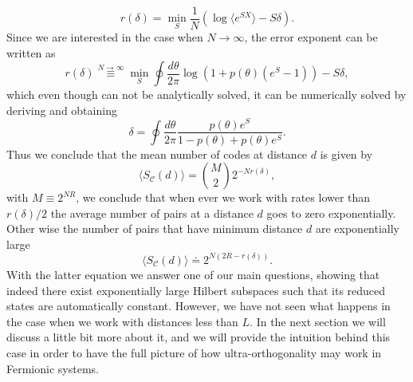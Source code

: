 \begin{equation}
r(\delta) = \min_{S} \frac{1}{N} \left(\log\langle e^{SX}\rangle - S\delta\right).
\end{equation}
\indent Since we are interested in the case when $N\to \infty$, the error exponent can be written as
\begin{equation}
r(\delta)\stackrel{N\to \infty}{\equiv}\min_{S}\oint \frac{d\theta}{2\pi}\log\left(1+p(\theta)(e^S -1)\right) -S\delta,
\label{CH2:Error_exponent}
\end{equation}
which even though can not be analytically solved, it can be numerically solved by deriving and obtaining
\begin{equation}
\delta = \oint \frac{d\theta}{2\pi} \frac{p(\theta)e^{S}}{1-p(\theta) + p(\theta)e^S}.
\end{equation}
\indent Thus we conclude that the mean number of codes at distance $d$ is given by
\begin{equation}
\langle S_{\mathcal{C}}(d)\rangle = {M \choose 2} 2^{-Nr(\delta)},
\end{equation}
with $M\equiv 2^{NR}$, we conclude that when ever we work with rates lower than $r(\delta)/2$ the average number of pairs at a distance $d$ goes to zero exponentially. Other wise the number of pairs that have minimum distance $d$ are exponentially large
\begin{equation}
\langle S_{\mathcal{C}}(d)\rangle \doteq  2^{N(2R-r(\delta))}.
\end{equation}
\indent With the latter equation we answer one of our main questions, showing that indeed there exist exponentially large Hilbert subspaces such that its reduced states are automatically constant. However, we have not seen what happens in the case when we work with distances less than $L$. In the next section we will discuss a little bit more about it, and we will provide the intuition behind this case in order to have the full picture of how ultra-orthogonality may work in Fermionic systems.
